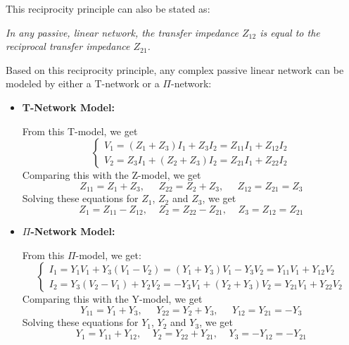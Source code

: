 \documentclass{article}
\begin{document}
This reciprocity principle can also be stated as:

{\em In any passive, linear network, the transfer impedance $Z_{12}$ is equal 
to the reciprocal transfer impedance $Z_{21}$.}

Based on this reciprocity principle, any complex passive linear network can
be modeled by either a T-network or a $\Pi$-network:

\begin{itemize}
  \item {\bf T-Network Model:}

    From this T-model, we get
    \begin{equation}	
      \left\{ \begin{array}{l} V_1=(Z_1+Z_3)I_1+Z_3I_2=Z_{11}I_1+Z_{12}I_2 \\
        V_2=Z_3I_1+(Z_2+Z_3)I_2=Z_{21}I_1+Z_{22}I_2  \end{array} \right. 
    \end{equation}
    Comparing this with the Z-model, we get
    \begin{equation}
      Z_{11}=Z_1+Z_3,\;\;\;\;\;Z_{22}=Z_2+Z_3,\;\;\;\;\;Z_{12}=Z_{21}=Z_3	
    \end{equation}
    Solving these equations for $Z_1$, $Z_2$ and $Z_3$, we get
    \begin{equation}
      Z_1=Z_{11}-Z_{12},\;\;\;\;Z_2=Z_{22}-Z_{21},\;\;\;\;Z_3=Z_{12}=Z_{21} 
    \end{equation}

  \item {\bf $\Pi$-Network Model:}

    From this $\Pi$-model, we get:
    \begin{equation} \left\{ \begin{array}{l} 
        I_1=Y_1V_1+Y_3(V_1-V_2)=(Y_1+Y_3)V_1-Y_3V_2=Y_{11}V_1+Y_{12}V_2 \\
        I_2=Y_3(V_2-V_1)+Y_2V_2=-Y_3V_1+(Y_2+Y_3)V_2=Y_{21}V_1+Y_{22}V_2 
      \end{array} \right. 
    \end{equation}
    Comparing this with the Y-model, we get
    \begin{equation} 
      Y_{11}=Y_1+Y_3,\;\;\;\;\;Y_{22}=Y_2+Y_3,\;\;\;\;\;Y_{12}=Y_{21}=-Y_3
    \end{equation}
    Solving these equations for $Y_1$, $Y_2$ and $Y_3$, we get
    \begin{equation}
      Y_1=Y_{11}+Y_{12},\;\;\;\;Y_2=Y_{22}+Y_{21},\;\;\;\;Y_3=-Y_{12}=-Y_{21} 
    \end{equation}
\end{itemize}
\end{document}
